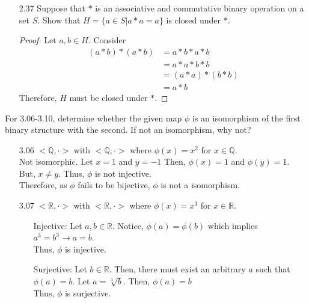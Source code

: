 \documentclass[12pt]{article}
\newcommand{\R}{\mathbb{R}}
\newcommand{\Q}{\mathbb{Q}}
\begin{document}
\begin{enumerate}
\begin{enumerate}
\begin{proof}
\begin{align*}
							  &= a * x * b\\
							  &= (a*x)*b\\
							  &= (x*a)*b\\
							  &= x*a*b\\
							  &= x*(a*b)
					\end{align*}
					Therefore, $ H $ is closed under $ * $.
				\end{proof}
			\item[2.37] Suppose that $*$ is an associative and commutative binary operation on a set $S$. Show that $H = \{a \in S | a*a = a\}$ is closed under $*$.
			\begin{proof}
				Let $ a,b\in H $. Consider
				\begin{align*}
					(a*b)*(a*b) &= a*b*a*b\\
								&= a*a*b*b\\
								&= (a*a)*(b*b)\\
								&= a*b
				\end{align*}
				Therefore, $ H $ must be closed under $ * $.
			\end{proof}
			
		\end{enumerate}
		
		For 3.06-3.10, determine whether the given map $\phi$ is an isomorphism of the first binary structure with the second. If not an isomorphism, why not?
		
		\begin{enumerate}
			\item[3.06] $<\Q,\cdot>$ with $<\Q,\cdot>$ where $\phi (x) = x^2$ for $x \in \Q$.\\
				Not isomorphic. Let $x=1 $ and $ y=-1$ Then, $\phi(x) = 1$ and $\phi(y) = 1 $. But, $x \not = y$. Thus, $ \phi $ is not injective.\\
				Therefore, as $\phi$ fails to be bijective, $ \phi $ is not a isomorphism.
			\item[3.07] $<\R,\cdot>$ with $<\R,\cdot>$ where $\phi (x) = x^3$ for $x \in \R$.
			\begin{enumerate}
				\item[Injective:] Let $a,b \in \R$. Notice, $\phi(a) = \phi(b)$ which implies  $a^3 = b^3 \rightarrow a=b$. \\
				Thus, $ \phi $ is injective.
				\item[Surjective:] Let $b \in \R$. Then, there must exist an arbitrary $a$ such that $\phi(a) = b$. Let $a=\sqrt[3]{b}.$ Then, $ \phi(a)=b $ \\
				Thus, $ \phi $ is surjective.
			\end{enumerate}
			

\end{enumerate}
\end{enumerate}
\end{document}
